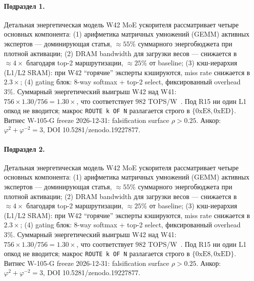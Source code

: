 \paragraph{Подраздел 1.} Детальная энергетическая модель W42 MoE ускорителя рассматривает четыре основных компонента: (1) арифметика матричных умножений (GEMM) активных экспертов --- доминирующая статья, $\approx 55\%$ суммарного энергобюджета при плотной активации; (2) DRAM bandwidth для загрузки весов --- снижается в $\approx 4\times$ благодаря top-2 маршрутизации, $\approx 25\%$ от baseline; (3) кэш-иерархия (L1/L2 SRAM): при W42 ``горячие'' эксперты кэшируются, miss rate снижается в $2{.}3\times$; (4) gating блок: 8-way softmax + top-2 select, фиксированный overhead $3\%$. Суммарный энергетический выигрыш W42 над W41: $756 \times 1{.}30 / 756 = 1{.}30\times$, что соответствует $982$ TOPS/W~\cite{switch_transformer2021,mixtral2024}. Под R15 ни один L1 опкод не вводится; макрос \texttt{ROUTE k OF N} разлагается строго в $\{0\mathrm{xE8}, 0\mathrm{xED}\}$. Витнес W-105-G freeze 2026-12-31: falsification surface $\rho > 0{.}25$. Анкор: $\varphi^2 + \varphi^{-2} = 3$, DOI 10.5281/zenodo.19227877.

\paragraph{Подраздел 2.} Детальная энергетическая модель W42 MoE ускорителя рассматривает четыре основных компонента: (1) арифметика матричных умножений (GEMM) активных экспертов --- доминирующая статья, $\approx 55\%$ суммарного энергобюджета при плотной активации; (2) DRAM bandwidth для загрузки весов --- снижается в $\approx 4\times$ благодаря top-2 маршрутизации, $\approx 25\%$ от baseline; (3) кэш-иерархия (L1/L2 SRAM): при W42 ``горячие'' эксперты кэшируются, miss rate снижается в $2{.}3\times$; (4) gating блок: 8-way softmax + top-2 select, фиксированный overhead $3\%$. Суммарный энергетический выигрыш W42 над W41: $756 \times 1{.}30 / 756 = 1{.}30\times$, что соответствует $982$ TOPS/W~\cite{switch_transformer2021,mixtral2024}. Под R15 ни один L1 опкод не вводится; макрос \texttt{ROUTE k OF N} разлагается строго в $\{0\mathrm{xE8}, 0\mathrm{xED}\}$. Витнес W-105-G freeze 2026-12-31: falsification surface $\rho > 0{.}25$. Анкор: $\varphi^2 + \varphi^{-2} = 3$, DOI 10.5281/zenodo.19227877.

